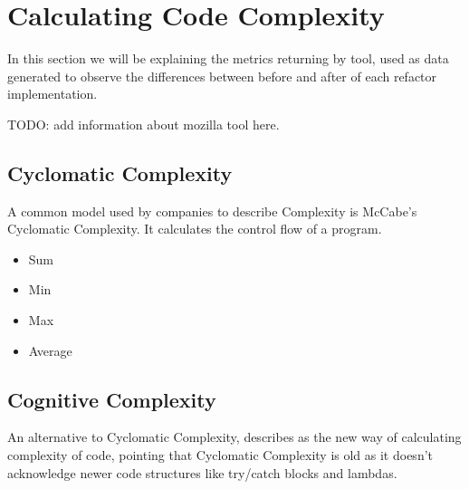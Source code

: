 \section{Calculating Code Complexity}

In this section we will be explaining the metrics returning by \cite{article:mozilla} tool, used as data generated to observe
the differences between before and after of each refactor implementation.

TODO: add information about mozilla tool here.

\subsection{Cyclomatic Complexity}

A common model used by companies to describe Complexity is McCabe's Cyclomatic Complexity. It calculates the control flow of a program.

\begin{itemize}
  \item Sum 
  \item Min 
  \item Max 
  \item Average 
\end{itemize}


\subsection{Cognitive Complexity}

An alternative to Cyclomatic Complexity, \cite{article:sonarpaper} describes as the new way of calculating complexity of code,
pointing that Cyclomatic Complexity is old as it doesn't acknowledge newer code structures like try/catch blocks and lambdas.


